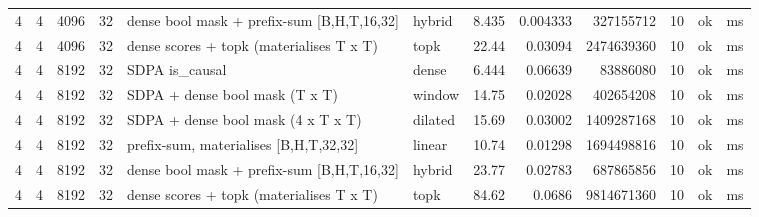 \begin{table}
\begin{tabular}{rrrrllrrrrll}
4 & 4 & 4096 & 32 & dense bool mask + prefix-sum [B,H,T,16,32] & hybrid & 8.435 & 0.004333 & 327155712 & 10 & ok & ms \\
4 & 4 & 4096 & 32 & dense scores + topk (materialises T x T) & topk & 22.44 & 0.03094 & 2474639360 & 10 & ok & ms \\
4 & 4 & 8192 & 32 & SDPA is\_causal & dense & 6.444 & 0.06639 & 83886080 & 10 & ok & ms \\
4 & 4 & 8192 & 32 & SDPA + dense bool mask (T x T) & window & 14.75 & 0.02028 & 402654208 & 10 & ok & ms \\
4 & 4 & 8192 & 32 & SDPA + dense bool mask (4 x T x T) & dilated & 15.69 & 0.03002 & 1409287168 & 10 & ok & ms \\
4 & 4 & 8192 & 32 & prefix-sum, materialises [B,H,T,32,32] & linear & 10.74 & 0.01298 & 1694498816 & 10 & ok & ms \\
4 & 4 & 8192 & 32 & dense bool mask + prefix-sum [B,H,T,16,32] & hybrid & 23.77 & 0.02783 & 687865856 & 10 & ok & ms \\
4 & 4 & 8192 & 32 & dense scores + topk (materialises T x T) & topk & 84.62 & 0.0686 & 9814671360 & 10 & ok & ms \\
\bottomrule
\end{tabular}
\end{table}
